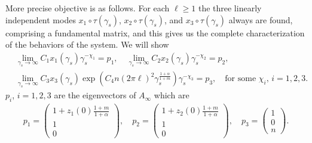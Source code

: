 \documentclass[a4paper,11pt]{article}
\def\l{(2\pi \ell)}
\theoremstyle{remark}
\begin{document}
More precise objective is as follows. For each $\ell\ge 1$ the three linearly independent modes $x_1\circ\tau(\gamma_s)$, $x_2\circ\tau(\gamma_s)$, and $x_3\circ\tau(\gamma_s)$ always are found, comprising a fundamental matrix, and this gives us the complete characterization of the behaviors of the system. We will show
\begin{equation}
\begin{aligned}
 &\lim_{\gamma_s \rightarrow \infty} C_1 x_1(\gamma_s) \gamma_s^{-\chi_1} = p_1, \quad \lim_{\gamma_s \rightarrow \infty} C_2x_2(\gamma_s)  \gamma_s^{-\chi_2} = p_2, \\
 &\lim_{\gamma_s \rightarrow \infty} C_3 x_3(\gamma_s) \exp\left(C_4n\l^2 \gamma_s^{\frac{1+\alpha}{1+m}}\right)\gamma_s^{-\chi_3} = p_3, \quad \text{for some $\chi_i$, $i=1,2,3$}.
 \end{aligned}
\end{equation}
$p_i$, $i=1,2,3$ are the eigenvectors of $A_\infty$ which are
\begin{align*}
  p_1=\begin{pmatrix} 1+z_1(0)\frac{1+m}{1+\alpha} \\ 1 \\  0 \end{pmatrix}, \quad
  p_2 = \begin{pmatrix} 1+z_2(0)\frac{1+m}{1+\alpha} \\ 1  \\ 0 \end{pmatrix}, \quad
  p_3 = \begin{pmatrix} 1 \\ 0 \\ n \end{pmatrix}.
 \end{align*}
\end{document}
